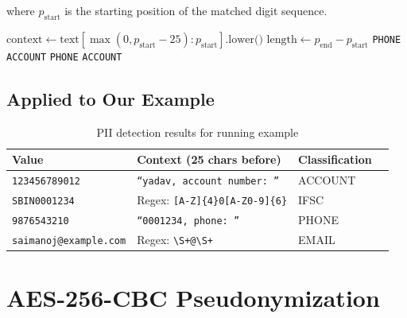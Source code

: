 where $p_{\text{start}}$ is the starting position of the matched digit sequence.

\begin{algorithm}[H]
\caption{PII Classification with Context Lookbehind}
\begin{algorithmic}[1]
    \State $\text{context} \gets \text{text}[\max(0, p_{\text{start}}-25) : p_{\text{start}}].\text{lower()}$
    \State $\text{length} \gets p_{\text{end}} - p_{\text{start}}$
        \State \Return \texttt{PHONE}
        \State \Return \texttt{ACCOUNT}
        \State \Return \texttt{PHONE} 
    \Else
        \State \Return \texttt{ACCOUNT}
    \EndIf
\EndProcedure
\end{algorithmic}
\end{algorithm}

\subsection{Applied to Our Example}

\begin{table}[H]
\centering
\caption{PII detection results for running example}
\label{tab:pii_results}
\begin{tabular}{llll}
\toprule
\textbf{Value} & \textbf{Context (25 chars before)} & \textbf{Classification} \\
\midrule
\texttt{123456789012} & \texttt{``yadav, account number: ''} & ACCOUNT \\
\texttt{SBIN0001234} & Regex: \texttt{[A-Z]\{4\}0[A-Z0-9]\{6\}} & IFSC \\
\texttt{9876543210} & \texttt{``0001234, phone: ''} & PHONE \\
\texttt{saimanoj@example.com} & Regex: \texttt{\textbackslash S+@\textbackslash S+} & EMAIL \\
\bottomrule
\end{tabular}
\end{table}

\section{AES-256-CBC Pseudonymization}

